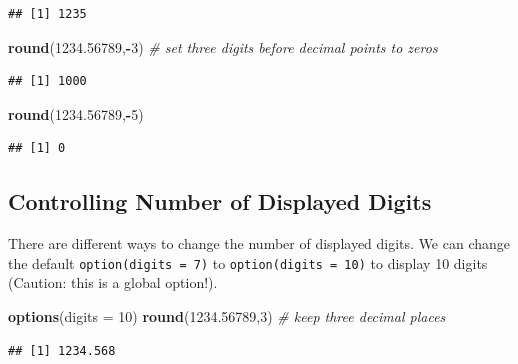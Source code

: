 \documentclass[
]{book}
\newenvironment{Shaded}{\begin{snugshade}}{\end{snugshade}}
\newcommand{\AttributeTok}[1]{\textcolor[rgb]{0.13,0.29,0.53}{#1}}
\newcommand{\CommentTok}[1]{\textcolor[rgb]{0.56,0.35,0.01}{\textit{#1}}}
\newcommand{\DecValTok}[1]{\textcolor[rgb]{0.00,0.00,0.81}{#1}}
\newcommand{\FloatTok}[1]{\textcolor[rgb]{0.00,0.00,0.81}{#1}}
\newcommand{\FunctionTok}[1]{\textcolor[rgb]{0.13,0.29,0.53}{\textbf{#1}}}
\newcommand{\NormalTok}[1]{#1}
\newcommand{\SpecialCharTok}[1]{\textcolor[rgb]{0.81,0.36,0.00}{\textbf{#1}}}
\begin{document}
\begin{verbatim}
## [1] 1235
\end{verbatim}

\begin{Shaded}
\begin{Highlighting}[]
\FunctionTok{round}\NormalTok{(}\FloatTok{1234.56789}\NormalTok{,}\SpecialCharTok{{-}}\DecValTok{3}\NormalTok{)   }\CommentTok{\# set three digits before decimal points to zeros}
\end{Highlighting}
\end{Shaded}

\begin{verbatim}
## [1] 1000
\end{verbatim}

\begin{Shaded}
\begin{Highlighting}[]
\FunctionTok{round}\NormalTok{(}\FloatTok{1234.56789}\NormalTok{,}\SpecialCharTok{{-}}\DecValTok{5}\NormalTok{)}
\end{Highlighting}
\end{Shaded}

\begin{verbatim}
## [1] 0
\end{verbatim}

\hypertarget{controlling-number-of-displayed-digits}{%
\subsection{Controlling Number of Displayed Digits}\label{controlling-number-of-displayed-digits}}

There are different ways to change the number of displayed digits. We can change the default \texttt{option(digits\ =\ 7)} to \texttt{option(digits\ =\ 10)} to display 10 digits (Caution: this is a global option!).

\begin{Shaded}
\begin{Highlighting}[]
\FunctionTok{options}\NormalTok{(}\AttributeTok{digits =} \DecValTok{10}\NormalTok{)}
\FunctionTok{round}\NormalTok{(}\FloatTok{1234.56789}\NormalTok{,}\DecValTok{3}\NormalTok{)    }\CommentTok{\# keep three decimal places}
\end{Highlighting}
\end{Shaded}

\begin{verbatim}
## [1] 1234.568
\end{verbatim}
\end{document}
